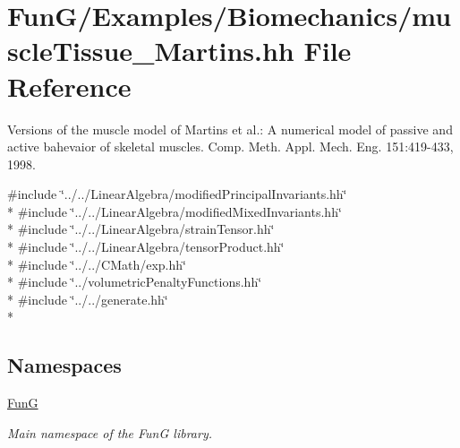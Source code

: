 \hypertarget{muscleTissue__Martins_8hh}{\section{Fun\-G/\-Examples/\-Biomechanics/muscle\-Tissue\-\_\-\-Martins.hh File Reference}
\label{muscleTissue__Martins_8hh}
}


Versions of the muscle model of Martins et al.\-: A numerical model of passive and active bahevaior of skeletal muscles. Comp. Meth. Appl. Mech. Eng. 151\-:419-\/433, 1998.  


{\ttfamily \#include \char`\"{}../../\-Linear\-Algebra/modified\-Principal\-Invariants.\-hh\char`\"{}}\\*
{\ttfamily \#include \char`\"{}../../\-Linear\-Algebra/modified\-Mixed\-Invariants.\-hh\char`\"{}}\\*
{\ttfamily \#include \char`\"{}../../\-Linear\-Algebra/strain\-Tensor.\-hh\char`\"{}}\\*
{\ttfamily \#include \char`\"{}../../\-Linear\-Algebra/tensor\-Product.\-hh\char`\"{}}\\*
{\ttfamily \#include \char`\"{}../../\-C\-Math/exp.\-hh\char`\"{}}\\*
{\ttfamily \#include \char`\"{}../volumetric\-Penalty\-Functions.\-hh\char`\"{}}\\*
{\ttfamily \#include \char`\"{}../../generate.\-hh\char`\"{}}\\*
\subsection*{Namespaces}
\begin{DoxyCompactItemize}
\item 
\hyperlink{namespaceFunG}{Fun\-G}
\begin{DoxyCompactList}\small\item\em Main namespace of the Fun\-G library. \end{DoxyCompactList}\end{DoxyCompactItemize}
